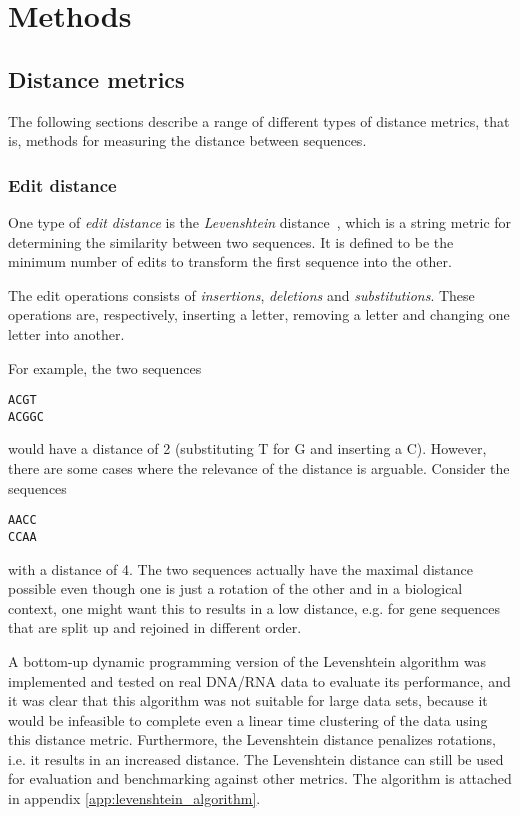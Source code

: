 \section{Methods}

\subsection{Distance metrics}

The following sections describe a range of different types of distance metrics,
that is, methods for measuring the distance between sequences.

\subsubsection{Edit distance}

One type of \emph{edit distance} is the \emph{Levenshtein}
distance~\cite{levenshtein}, which is a string metric for determining the
similarity between two sequences. It is defined to be the minimum number of
edits to transform the first sequence into the other.~\cite[p.~52]{dong}

The edit operations consists of \emph{insertions}, \emph{deletions} and
\emph{substitutions}. These operations are, respectively, inserting a letter,
removing a letter and changing one letter into another.

For example, the two sequences
\begin{center}
  \texttt{ACGT} \\
  \texttt{ACGGC}
\end{center}
would have a distance of 2 (substituting T for G and inserting a C). However,
there are some cases where the relevance of the distance is arguable. Consider
the sequences
\begin{center}
  \texttt{AACC} \\
  \texttt{CCAA}
\end{center}
with a distance of 4. The two sequences actually have the maximal distance
possible even though one is just a rotation of the other and in a biological
context, one might want this to results in a low distance, e.g. for gene
sequences that are split up and rejoined in different order.

A bottom-up dynamic programming version of the Levenshtein algorithm was
implemented and tested on real DNA/RNA data to evaluate its performance, and it
was clear that this algorithm was not suitable for large data sets, because it
would be infeasible to complete even a linear time clustering of the data using
this distance metric. Furthermore, the Levenshtein distance penalizes
rotations, i.e. it results in an increased distance. The Levenshtein distance
can still be used for evaluation and benchmarking against other metrics. The
algorithm is attached in appendix \ref{app:levenshtein_algorithm}.

